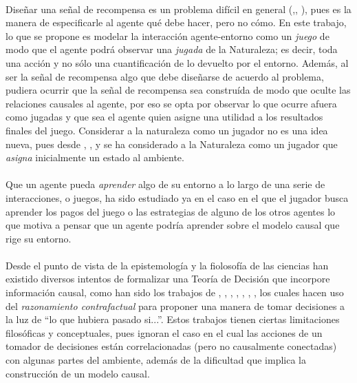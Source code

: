 \documentclass[11pt]{article}
\theoremstyle{plain}
\begin{document}
\\
\indent Diseñar una señal de recompensa es un problema difícil en general (\cite{sutton1998reinforcement},\cite{dewey2014reinforcement}, \cite{DRLnotwork}), pues es la manera de especificarle al agente qué debe hacer, pero no cómo. En este trabajo, lo que se propone es modelar la interacción agente-entorno como un \textit{juego} de modo que el agente podrá observar una \textit{jugada} de la Naturaleza; es decir, toda una acción y no sólo una cuantificación de lo devuelto por el entorno.  Además, al ser la señal de recompensa algo que debe diseñarse de acuerdo al problema, pudiera ocurrir que la señal de recompensa sea construída de modo que oculte las relaciones causales al agente, por eso se opta por observar lo que ocurre afuera como jugadas y que sea el agente quien asigne una utilidad a los resultados finales del juego. Considerar a la naturaleza como un jugador no es una idea nueva, pues desde \cite{milnor1951games}, \cite{papadimitriou1985games}, \cite{Szep1985} y \cite{eiselt2004games} se ha considerado a la Naturaleza como un jugador que \textit{asigna} inicialmente un estado al ambiente.\\
\\
\indent Que un agente pueda \textit{aprender} algo de su entorno a lo largo de una serie de interacciones, o juegos, ha sido estudiado ya en el caso en el que el jugador busca aprender los pagos del juego o las estrategias de alguno de los otros agentes \cite{fudenberg1998learning} lo que motiva a pensar que un agente podría aprender sobre el modelo causal que rige su entorno. \\
\\
\indent Desde el punto de vista de la epistemología y la fiolosofía de las ciencias han existido diversos intentos de formalizar una Teoría de Decisión que incorpore información causal, como han sido los trabajos de \cite{joyce1999foundations}, \cite{board2006equivalence}, \cite{joyce2012regret}, \cite{ahmed2012push}, \cite{rottman2014reasoning}, \cite{soares2015toward}, \cite{stalnaker2016knowledge}, los cuales hacen uso del \textit{razonamiento contrafactual} para proponer una manera de tomar decisiones a la luz de “lo que hubiera pasado si...”. Estos trabajos tienen ciertas limitaciones filosóficas y conceptuales, pues ignoran el caso en el cual las acciones de un tomador de decisiones están correlacionadas (pero no causalmente conectadas) con algunas partes del ambiente, además de la dificultad que implica la construcción de un modelo causal.
\end{document}
